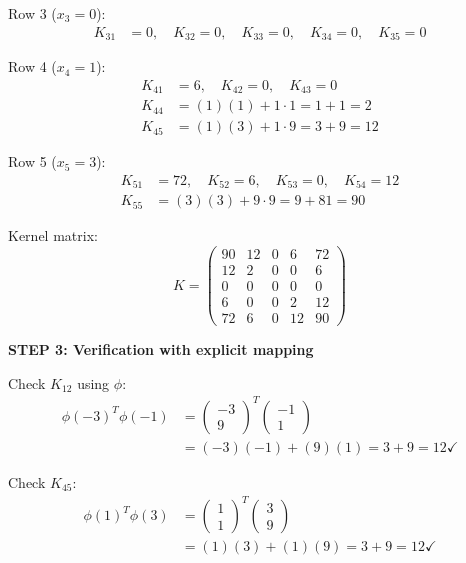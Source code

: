 \documentclass[12pt]{article}
\begin{document}
\begin{solution}
Row 3 ($x_3 = 0$):
\begin{align*}
K_{31} &= 0, \quad K_{32} = 0, \quad K_{33} = 0, \quad K_{34} = 0, \quad K_{35} = 0
\end{align*}

Row 4 ($x_4 = 1$):
\begin{align*}
K_{41} &= 6, \quad K_{42} = 0, \quad K_{43} = 0 \\
K_{44} &= (1)(1) + 1 \cdot 1 = 1 + 1 = 2 \\
K_{45} &= (1)(3) + 1 \cdot 9 = 3 + 9 = 12
\end{align*}

Row 5 ($x_5 = 3$):
\begin{align*}
K_{51} &= 72, \quad K_{52} = 6, \quad K_{53} = 0, \quad K_{54} = 12 \\
K_{55} &= (3)(3) + 9 \cdot 9 = 9 + 81 = 90
\end{align*}

Kernel matrix:
\[
K = \begin{pmatrix}
90 & 12 & 0 & 6 & 72 \\
12 & 2 & 0 & 0 & 6 \\
0 & 0 & 0 & 0 & 0 \\
6 & 0 & 0 & 2 & 12 \\
72 & 6 & 0 & 12 & 90
\end{pmatrix}
\]

\textbf{STEP 3: Verification with explicit mapping}

Check $K_{12}$ using $\phi$:
\begin{align*}
\phi(-3)^T \phi(-1) &= \begin{pmatrix} -3 \\ 9 \end{pmatrix}^T \begin{pmatrix} -1 \\ 1 \end{pmatrix} \\
&= (-3)(-1) + (9)(1) = 3 + 9 = 12 \checkmark
\end{align*}

Check $K_{45}$:
\begin{align*}
\phi(1)^T \phi(3) &= \begin{pmatrix} 1 \\ 1 \end{pmatrix}^T \begin{pmatrix} 3 \\ 9 \end{pmatrix} \\
&= (1)(3) + (1)(9) = 3 + 9 = 12 \checkmark
\end{align*}


\end{solution}
\end{document}
